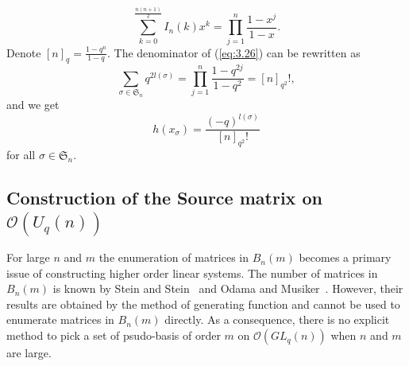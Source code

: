 \documentclass[table,a4paper,reqno]{amsart}
\numberwithin{equation}{section}
\theoremstyle{definition}
\begin{document}
\begin{equation}
    \sum_{k=0}^{\frac{n(n+1)}{2}}I_n(k)x^{k}=\prod_{j=1}^n\frac{1-x^j}{1-x}. 
\end{equation}
Denote $[n]_q=\frac{1-q^n}{1-q}$. The denominator of (\ref{eq:3.26}) can be rewritten as
\begin{equation}
    \sum_{\sigma\in\mathfrak{S}_n}q^{2l(\sigma)}=\prod_{j=1}^n\frac{1-q^{2j}}{1-q^2}=[n]_{q^2}!,
\end{equation}
and we get
\begin{equation}\label{eq:3.30}
    h(x_{\sigma})=\frac{(-q)^{l(\sigma)}}{[n]_{q^2}!}
\end{equation}
for all $\sigma\in\mathfrak{S}_n$.

\subsection{Construction of the Source matrix on $\mathcal{O}(U_q(n))$}

 For large $n$ and $m$ the enumeration of matrices in $B_n(m)$ becomes a primary issue of constructing higher order linear systems. The number of matrices in $B_n(m)$ is known by Stein and Stein~\cite{stein1970enumeration} and Odama and Musiker~\cite{odama2001enumeration}. However, their results are obtained by the method of generating function and cannot be used to enumerate matrices in $B_n(m)$ directly. As a consequence, there is no explicit method to pick a set of psudo-basis of order $m$ on $\mathcal{O}(GL_q(n))$ when $n$ and $m$ are large. 
\end{document}
